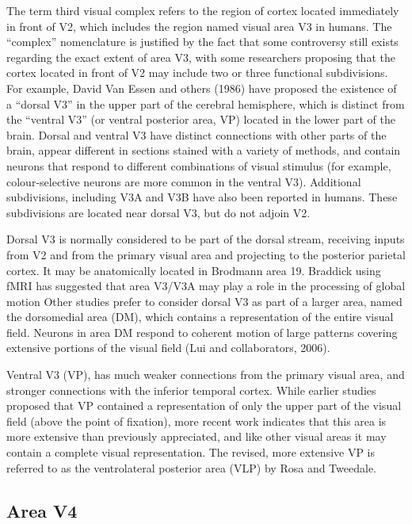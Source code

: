 The term third visual complex refers to the region of cortex located immediately in front of V2, which includes the region named visual area V3 in humans. The ``complex'' nomenclature is justified by the fact that some controversy still exists regarding the exact extent of area V3, with some researchers proposing that the cortex located in front of V2 may include two or three functional subdivisions. For example, David Van Essen and others (1986) have proposed the existence of a ``dorsal V3'' in the upper part of the cerebral hemisphere, which is distinct from the ``ventral V3'' (or ventral posterior area, VP) located in the lower part of the brain. Dorsal and ventral V3 have distinct connections with other parts of the brain, appear different in sections stained with a variety of methods, and contain neurons that respond to different combinations of visual stimulus (for example, colour-selective neurons are more common in the ventral V3). Additional subdivisions, including V3A and V3B have also been reported in humans. These subdivisions are located near dorsal V3, but do not adjoin V2.

Dorsal V3 is normally considered to be part of the dorsal stream, receiving inputs from V2 and from the primary visual area and projecting to the posterior parietal cortex. It may be anatomically located in Brodmann area 19. Braddick using fMRI has suggested that area V3/V3A may play a role in the processing of global motion Other studies prefer to consider dorsal V3 as part of a larger area, named the dorsomedial area (DM), which contains a representation of the entire visual field. Neurons in area DM respond to coherent motion of large patterns covering extensive portions of the visual field (Lui and collaborators, 2006).

Ventral V3 (VP), has much weaker connections from the primary visual area, and stronger connections with the inferior temporal cortex. While earlier studies proposed that VP contained a representation of only the upper part of the visual field (above the point of fixation), more recent work indicates that this area is more extensive than previously appreciated, and like other visual areas it may contain a complete visual representation. The revised, more extensive VP is referred to as the ventrolateral posterior area (VLP) by Rosa and Tweedale.

\hypertarget{area-v4}{%
\subsection{Area V4}\label{area-v4}}

